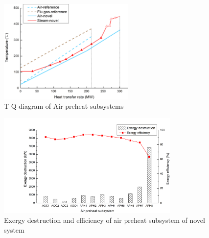 \documentclass[preprint,12pt]{elsarticle}
\begin{document}
\begin{figure}[htbp]
\centering
\includegraphics[width=0.6\textwidth]{fig/APH_temper_compare.png}
\caption{T-Q diagram of Air preheat subsystems} 
\label{fig:APH_temper_compare}
\end{figure}
\begin{figure}[htbp]
\centering
\includegraphics[width=0.8\textwidth]{fig/novel_APH_exergy.png}
\caption{Exergy destruction and efficiency of air preheat subsystem of novel system} 
\label{fig:novel_APH_exergy}
\end{figure}
\end{document}
